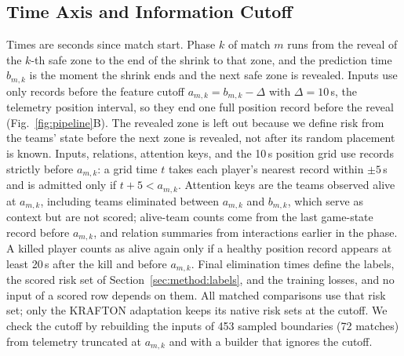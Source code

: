 \documentclass[sigconf,anonymous]{acmart}
\begin{document}
\subsection{Time Axis and Information Cutoff}
\label{sec:method:samples}
Times are seconds since match start. Phase $k$ of match $m$ runs from the reveal of the $k$-th safe zone to the end of the shrink to that zone, and the prediction time $b_{m,k}$ is the moment the shrink ends and the next safe zone is revealed. Inputs use only records before the feature cutoff $a_{m,k}=b_{m,k}-\Delta$ with $\Delta=10$\,s, the telemetry position interval, so they end one full position record before the reveal (Fig.~\ref{fig:pipeline}B). The revealed zone is left out because we define risk from the teams' state before the next zone is revealed, not after its random placement is known. Inputs, relations, attention keys, and the 10\,s position grid use records strictly before $a_{m,k}$: a grid time $t$ takes each player's nearest record within $\pm5$\,s and is admitted only if $t+5<a_{m,k}$. Attention keys are the teams observed alive at $a_{m,k}$, including teams eliminated between $a_{m,k}$ and $b_{m,k}$, which serve as context but are not scored; alive-team counts come from the last game-state record before $a_{m,k}$, and relation summaries from interactions earlier in the phase. A killed player counts as alive again only if a healthy position record appears at least 20\,s after the kill and before $a_{m,k}$. Final elimination times define the labels, the scored risk set of Section~\ref{sec:method:labels}, and the training losses, and no input of a scored row depends on them. All matched comparisons use that risk set; only the KRAFTON adaptation keeps its native risk sets at the cutoff. We check the cutoff by rebuilding the inputs of 453 sampled boundaries (72 matches) from telemetry truncated at $a_{m,k}$ and with a builder that ignores the cutoff.
\end{document}
